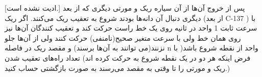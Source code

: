 [ادیت نشده است.]
\p 
        پس از خروج آن‌ها از آن سیاره ریک و مورتی دیگری که از بعد دیگری دنبال آن دانه‌ها بودند شروع به تعقیب ریک می‌کنند. اگر ریک (از بعد C-137 ) با سرعت ثابت 1 واحد در ثانیه روی یک خط راست حرکت کند و تعقیب کنندگان آن‌ها نیز روی همان خط ولی با سرعت متغیر صحیح(نامنفی) حرکت کنند ولی از آن‌ها جلو نزنند(می توانند به آن‌ها برسند) و مقصد ریک در فاصله n واحد از نقطه شروع باشد( با فرض اینکه هر دو در یک نقطه شروع به حرکت کرده اند) تعداد راه‌های تعقیب شدن ریک و مورتی را تا وقتی به مقصد می‌رسند به صورت بازگشتی حساب کنید.)
        
    